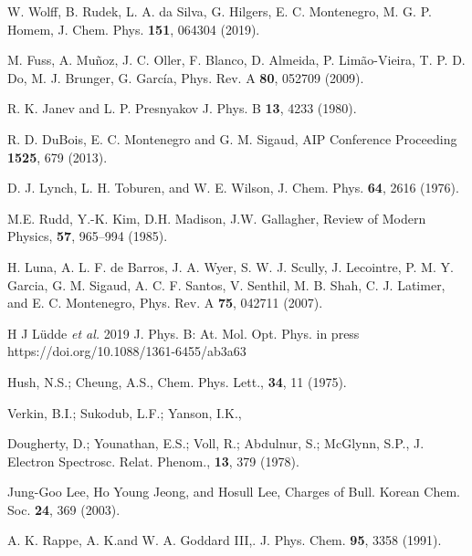 \documentclass[10pt,showpacs,showkeys,twocolumn]{revtex4}
\begin{document}
\begin{thebibliography}{}
W. Wolff, B. Rudek, L. A. da Silva, G. Hilgers, E. C. Montenegro, 
M. G. P. Homem,
J. Chem. Phys. \textbf{151}, 064304 (2019).

M. Fuss, A. Muñoz, J. C. Oller, F. Blanco, D. Almeida, P. Limão-Vieira, 
T. P. D. Do, M. J. Brunger, G. Garc\'{i}a,
Phys. Rev. A \textbf{80}, 052709 (2009).

R. K. Janev and L. P. Presnyakov 
J. Phys. B \textbf{13}, 4233 (1980).

R. D. DuBois, E. C. Montenegro and G. M. Sigaud,
AIP Conference Proceeding \textbf{1525}, 679 (2013).

D. J. Lynch, L. H. Toburen, and W. E. Wilson,
J. Chem. Phys. \textbf{64}, 2616 (1976).

M.E. Rudd, Y.-K. Kim, D.H. Madison, J.W. Gallagher,
Review of Modern Physics, \textbf{57}, 965--994 (1985).

H. Luna, A. L. F. de Barros, J. A. Wyer, S. W. J. Scully, J. Lecointre, 
P. M. Y. Garcia, G. M. Sigaud, A. C. F. Santos, V. Senthil, M. B. Shah, 
C. J. Latimer, and E. C. Montenegro,
Phys. Rev. A \textbf{75}, 042711 (2007).

H J L\"udde {\it et al.} 2019 
J. Phys. B: At. Mol. Opt. Phys. in press 
https://doi.org/10.1088/1361-6455/ab3a63

Hush, N.S.; Cheung, A.S., 
Chem. Phys. Lett., \textbf{34}, 11 (1975).

Verkin, B.I.; Sukodub, L.F.; Yanson, I.K., 

Dougherty, D.; Younathan, E.S.; Voll, R.; Abdulnur, S.; McGlynn, S.P., 
J. Electron Spectrosc. Relat. Phenom., \textbf{13}, 379 (1978).

Jung-Goo Lee, Ho Young Jeong, and Hosull Lee, Charges of
Bull. Korean Chem. Soc. \textbf{24}, 369 (2003).

A. K. Rappe, A. K.and W. A. Goddard III,. 
J. Phys. Chem. \textbf{95}, 3358 (1991).

\end{thebibliography}
\end{document}
